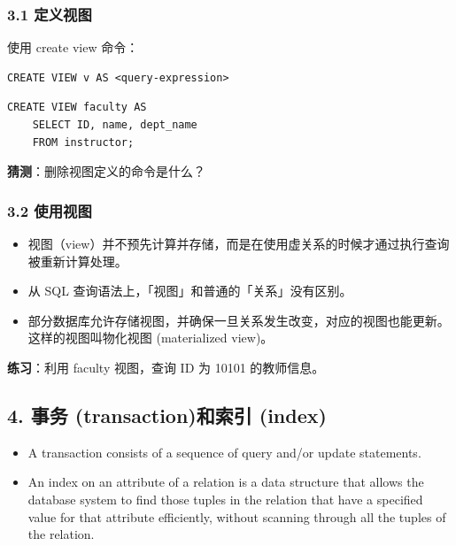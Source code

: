 \documentclass[aspectratio=169, 14pt]{beamer}
\begin{document}
\begin{frame}[fragile]
    \frametitle{3.1 定义视图}
使用 \alert{create view} 命令：

\begin{verbatim}
CREATE VIEW v AS <query-expression>
\end{verbatim}
    
\begin{verbatim}
CREATE VIEW faculty AS
    SELECT ID, name, dept_name
    FROM instructor;
\end{verbatim}

\pause
\textbf{猜测}：删除视图定义的命令是什么？
\end{frame}

\begin{frame}
    \frametitle{3.2 使用视图}
\begin{itemize}
    \item<1-> 视图（view）并不预先计算并存储，而是在使用虚关系的时候才通过执行查询被重新计算处理。
    \item<1-> 从 SQL 查询语法上，「视图」和普通的「关系」没有区别。
    \item<2-> 部分数据库允许存储视图，并确保一旦关系发生改变，对应的视图也能更新。这样的视图叫\alert{物化视图} (materialized view)。
\end{itemize}

\pause
{\large {}}  \textbf{练习}：利用 faculty 视图，查询 ID 为 10101 的教师信息。

\end{frame}

\begin{frame}
    \section{\textcolor{darkmidnightblue}{4. 事务 (transaction)和索引 (index)}}
\begin{itemize}
    \item A \alert{transaction} consists of a sequence of query and/or update statements.
    \item An \alert{index} on an attribute of a relation is a data structure that allows the database system to find those tuples in the relation that have a specified value for that attribute efficiently, without scanning through all the tuples of the relation.
\end{itemize}
\end{frame}
\end{document}
